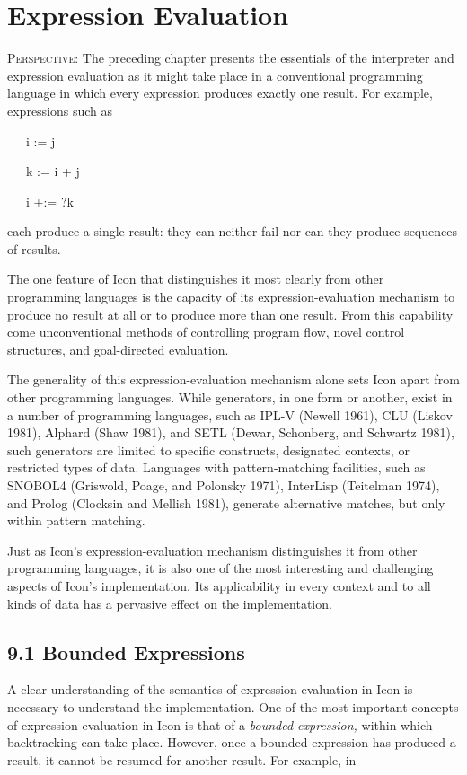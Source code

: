 \chapter{Expression Evaluation}

\textsc{Perspective}: The preceding chapter presents the essentials of
the interpreter and expression evaluation as it might take place in a
conventional programming language in which every expression produces
exactly one result. For example, expressions such as

{\ttfamily\mdseries
\ \ \ i := j}

{\ttfamily\mdseries
\ \ \ k := i + j}

{\ttfamily\mdseries
\ \ \ i +:= ?k}

\noindent each produce a single result: they can neither fail nor can
they produce sequences of results.

The one feature of Icon that distinguishes it most clearly from other
programming languages is the capacity of its expression-evaluation
mechanism to produce no result at all or to produce more than one
result. From this capability come unconventional methods of
controlling program flow, novel control structures, and goal-directed
evaluation.

The generality of this expression-evaluation mechanism alone sets Icon
apart from other programming languages. While generators, in one form
or another, exist in a number of programming languages, such as IPL-V
(Newell 1961), CLU (Liskov 1981), Alphard (Shaw 1981), and SETL
(Dewar, Schonberg, and Schwartz 1981), such generators are limited to
specific constructs, designated contexts, or restricted types of
data. Languages with pattern-matching facilities, such as SNOBOL4
(Griswold, Poage, and Polonsky 1971), InterLisp (Teitelman 1974), and
Prolog (Clocksin and Mellish 1981), generate alternative matches, but
only within pattern matching.

Just as Icon's expression-evaluation mechanism distinguishes it from
other programming languages, it is also one of the most interesting
and challenging aspects of Icon's implementation. Its applicability in
every context and to all kinds of data has a pervasive effect on the
implementation.


\section[9.1 Bounded Expressions]{9.1 Bounded Expressions}

A clear understanding of the semantics of expression evaluation in
Icon is necessary to understand the implementation.  One of the most
important concepts of expression evaluation in Icon is that of a
\textit{bounded expression, }within which backtracking can take
place. However, once a bounded expression has produced a result, it
cannot be resumed for another result. For example, in

